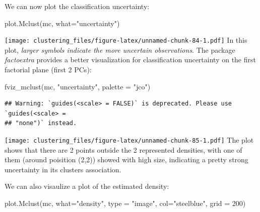 \documentclass[
]{article}
\newenvironment{Shaded}{\begin{snugshade}}{\end{snugshade}}
\newcommand{\AttributeTok}[1]{\textcolor[rgb]{0.77,0.63,0.00}{#1}}
\newcommand{\DecValTok}[1]{\textcolor[rgb]{0.00,0.00,0.81}{#1}}
\newcommand{\FunctionTok}[1]{\textcolor[rgb]{0.00,0.00,0.00}{#1}}
\newcommand{\NormalTok}[1]{#1}
\newcommand{\StringTok}[1]{\textcolor[rgb]{0.31,0.60,0.02}{#1}}
\begin{document}
We can now plot the classification uncertainty:

\begin{Shaded}
\begin{Highlighting}[]
\FunctionTok{plot.Mclust}\NormalTok{(mc, }\AttributeTok{what=}\StringTok{"uncertainty"}\NormalTok{)}
\end{Highlighting}
\end{Shaded}

\texttt{[image: clustering\_files/figure-latex/unnamed-chunk-84-1.pdf]}
In this plot, \emph{larger symbols indicate the more uncertain
observations}. The package \emph{factoextra} provides a better
visualization for classification uncertainty on the first factorial
plane (first 2 PCs):

\begin{Shaded}
\begin{Highlighting}[]
\FunctionTok{fviz\_mclust}\NormalTok{(mc, }\StringTok{"uncertainty"}\NormalTok{, }\AttributeTok{palette =} \StringTok{"jco"}\NormalTok{)}
\end{Highlighting}
\end{Shaded}

\begin{verbatim}
## Warning: `guides(<scale> = FALSE)` is deprecated. Please use `guides(<scale> =
## "none")` instead.
\end{verbatim}

\texttt{[image: clustering\_files/figure-latex/unnamed-chunk-85-1.pdf]}
The plot shows that there are 2 points outside the 2 represented
densities, with one of them (around poisition (2,2)) showed with high
size, indicating a pretty strong uncertainty in its clusters
association.

We can also visaulize a plot of the estimated density:

\begin{Shaded}
\begin{Highlighting}[]
\FunctionTok{plot.Mclust}\NormalTok{(mc, }\AttributeTok{what=}\StringTok{"density"}\NormalTok{, }\AttributeTok{type =} \StringTok{"image"}\NormalTok{, }\AttributeTok{col=}\StringTok{"steelblue"}\NormalTok{, }\AttributeTok{grid =} \DecValTok{200}\NormalTok{)}
\end{Highlighting}
\end{Shaded}
\end{document}
